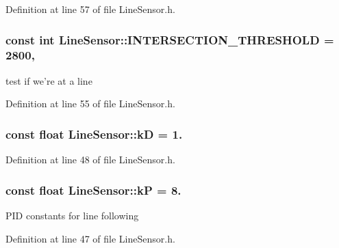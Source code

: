 Definition at line 57 of file Line\-Sensor.\-h.

\hypertarget{classLineSensor_a55b9f63bd4c01990f6f2d7baa830d2ec}{
\subsubsection[{I\-N\-T\-E\-R\-S\-E\-C\-T\-I\-O\-N\-\_\-\-T\-H\-R\-E\-S\-H\-O\-L\-D}]{\setlength{\rightskip}{0pt plus 5cm}const int Line\-Sensor\-::\-I\-N\-T\-E\-R\-S\-E\-C\-T\-I\-O\-N\-\_\-\-T\-H\-R\-E\-S\-H\-O\-L\-D = 2800\hspace{0.3cm}{\ttfamily [static]}, {\ttfamily [private]}}}\label{classLineSensor_a55b9f63bd4c01990f6f2d7baa830d2ec}


test if we're at a line 



Definition at line 55 of file Line\-Sensor.\-h.

\hypertarget{classLineSensor_a62c587ff3d58f72a74ae39429b7d0837}{
\subsubsection[{k\-D}]{\setlength{\rightskip}{0pt plus 5cm}const float Line\-Sensor\-::k\-D = 1.\hspace{0.3cm}{\ttfamily [private]}}}\label{classLineSensor_a62c587ff3d58f72a74ae39429b7d0837}


Definition at line 48 of file Line\-Sensor.\-h.

\hypertarget{classLineSensor_af246497cb5a3386afcc4ce864949c57f}{
\subsubsection[{k\-P}]{\setlength{\rightskip}{0pt plus 5cm}const float Line\-Sensor\-::k\-P = 8.\hspace{0.3cm}{\ttfamily [private]}}}\label{classLineSensor_af246497cb5a3386afcc4ce864949c57f}
P\-I\-D constants for line following 

Definition at line 47 of file Line\-Sensor.\-h.

